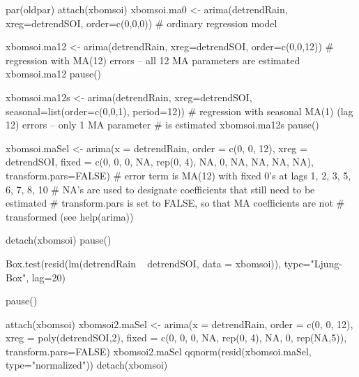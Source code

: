 \begin{Examples}
\begin{ExampleCode}
par(oldpar)
attach(xbomsoi)
xbomsoi.ma0 <- arima(detrendRain, xreg=detrendSOI, order=c(0,0,0))
# ordinary regression model

xbomsoi.ma12 <- arima(detrendRain, xreg=detrendSOI,
                      order=c(0,0,12))
# regression with MA(12) errors -- all 12 MA parameters are estimated
xbomsoi.ma12
pause()

xbomsoi.ma12s <- arima(detrendRain, xreg=detrendSOI,
                      seasonal=list(order=c(0,0,1), period=12))
# regression with seasonal MA(1) (lag 12) errors -- only 1 MA parameter
# is estimated
xbomsoi.ma12s
pause()

xbomsoi.maSel <- arima(x = detrendRain, order = c(0, 0, 12),
                        xreg = detrendSOI, fixed = c(0, 0, 0,
                        NA, rep(0, 4), NA, 0, NA, NA, NA, NA),
                        transform.pars=FALSE)
# error term is MA(12) with fixed 0's at lags 1, 2, 3, 5, 6, 7, 8, 10
# NA's are used to designate coefficients that still need to be estimated
# transform.pars is set to FALSE, so that MA coefficients are not
# transformed (see help(arima))

detach(xbomsoi)
pause()

Box.test(resid(lm(detrendRain ~ detrendSOI, data = xbomsoi)),
          type="Ljung-Box", lag=20)

pause()

attach(xbomsoi)
 xbomsoi2.maSel <- arima(x = detrendRain, order = c(0, 0, 12),
                         xreg = poly(detrendSOI,2), fixed = c(0,
                         0, 0, NA, rep(0, 4), NA, 0, rep(NA,5)),
                         transform.pars=FALSE)
 xbomsoi2.maSel
qqnorm(resid(xbomsoi.maSel, type="normalized"))
detach(xbomsoi)

\end{ExampleCode}
\end{Examples}

